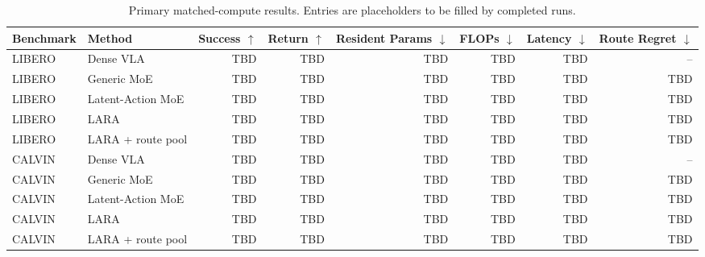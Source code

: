 \documentclass[10pt]{article}
\begin{document}
\begin{table}[t]
\centering
\caption{Primary matched-compute results. Entries are placeholders to be filled by completed runs.}
\label{tab:main}
\small
\begin{tabular}{llrrrrrr}
\toprule
Benchmark & Method & Success $\uparrow$ & Return $\uparrow$ & Resident Params $\downarrow$ & FLOPs $\downarrow$ & Latency $\downarrow$ & Route Regret $\downarrow$ \\
\midrule
LIBERO & Dense VLA & TBD & TBD & TBD & TBD & TBD & -- \\
LIBERO & Generic MoE & TBD & TBD & TBD & TBD & TBD & TBD \\
LIBERO & Latent-Action MoE & TBD & TBD & TBD & TBD & TBD & TBD \\
LIBERO & LARA & TBD & TBD & TBD & TBD & TBD & TBD \\
LIBERO & LARA + route pool & TBD & TBD & TBD & TBD & TBD & TBD \\
\midrule
CALVIN & Dense VLA & TBD & TBD & TBD & TBD & TBD & -- \\
CALVIN & Generic MoE & TBD & TBD & TBD & TBD & TBD & TBD \\
CALVIN & Latent-Action MoE & TBD & TBD & TBD & TBD & TBD & TBD \\
CALVIN & LARA & TBD & TBD & TBD & TBD & TBD & TBD \\
CALVIN & LARA + route pool & TBD & TBD & TBD & TBD & TBD & TBD \\
\bottomrule
\end{tabular}
\end{table}
\end{document}
